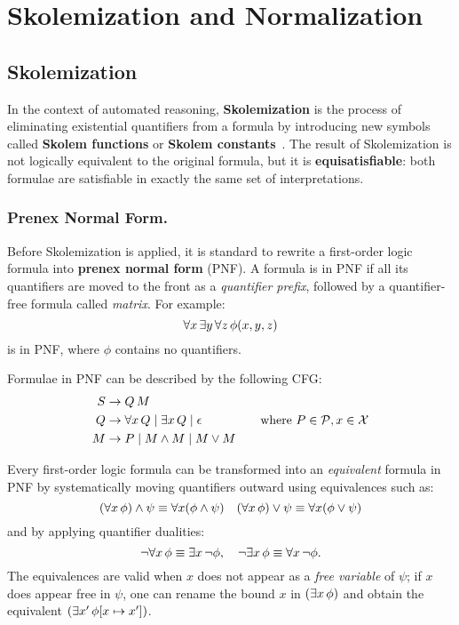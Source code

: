 \section{Skolemization and Normalization}

\subsection{Skolemization}
In the context of automated reasoning, \textbf{Skolemization} is the process of eliminating existential quantifiers from a formula by introducing new symbols called \textbf{Skolem functions} or \textbf{Skolem constants}~\cite{skolem1920,chang1997,baader2001}.  
The result of Skolemization is not logically equivalent to the original formula, but it is \textbf{equisatisfiable}: both formulae are satisfiable in exactly the same set of interpretations.

\subsubsection{Prenex Normal Form.}
Before Skolemization is applied, it is standard to rewrite a first-order logic formula into \textbf{prenex normal form} (PNF).  
A formula is in PNF if all its quantifiers are moved to the front as a \emph{quantifier prefix}, followed by a quantifier-free formula called \emph{matrix}.  
For example:
\[
\forall x \, \exists y \, \forall z \, \phi(x,y,z)
\]
is in PNF, where \(\phi\) contains no quantifiers.

Formulae in PNF can be described by the following CFG\@:
\begin{equation}
  \begin{aligned}
    S &\to Q \, M \\
    Q &\to \forall x \, Q \mid \exists x \, Q \mid \epsilon \\
    M &\to P \mid M \land M \mid M \lor M
  \end{aligned}
  \quad\quad \text{where } P \in \mathcal{P}, x \in \mathcal{X}
\end{equation}

Every first-order logic formula can be transformed into an \emph{equivalent} formula in PNF by systematically moving quantifiers outward using equivalences such as:
\[
(\forall x \, \phi) \land \psi \equiv \forall x (\phi \land \psi) 
\quad
(\forall x \, \phi) \lor \psi \equiv \forall x (\phi \lor \psi)
\]
and by applying quantifier dualities:
\[
\neg \forall x \, \phi \equiv \exists x \, \neg \phi, 
\quad
\neg \exists x \, \phi \equiv \forall x \, \neg \phi.
\]
The equivalences are valid when \(x\) does not appear as a \textit{free variable} of \(\psi\); 
if \(x\) does appear free in \(\psi\), one can rename the bound \(x\) in \((\exists x\,\phi)\) 
and obtain the equivalent \((\exists x'\,\phi[x\mapsto x'])\).

